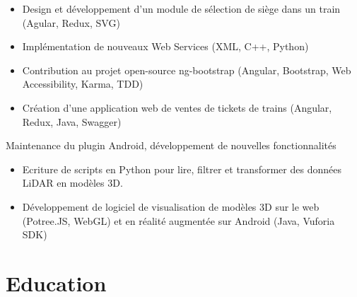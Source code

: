 \documentclass[11pt,a4paper,sans]{moderncv} %
\begin{document}
{\begin{itemize}
    \item Design et développement d'un module de sélection de siège dans un train (Agular, Redux, SVG)
    \item Implémentation de nouveaux Web Services (XML, C++, Python)
    \item Contribution au projet open-source ng-bootstrap (Angular, Bootstrap, Web Accessibility, Karma, TDD)
    \item Création d'une application web de ventes de tickets de trains (Angular, Redux, Java, Swagger)
\end{itemize}}

{Maintenance du plugin Android, développement de nouvelles fonctionnalités}

{\begin{itemize}
    \item Ecriture de scripts en Python pour lire, filtrer et transformer des données LiDAR en modèles 3D.
    \item Développement de logiciel de visualisation de modèles 3D sur le web (Potree.JS, WebGL) et en réalité augmentée sur Android (Java, Vuforia SDK)
\end{itemize}}

\section{Education}

\end{document}
